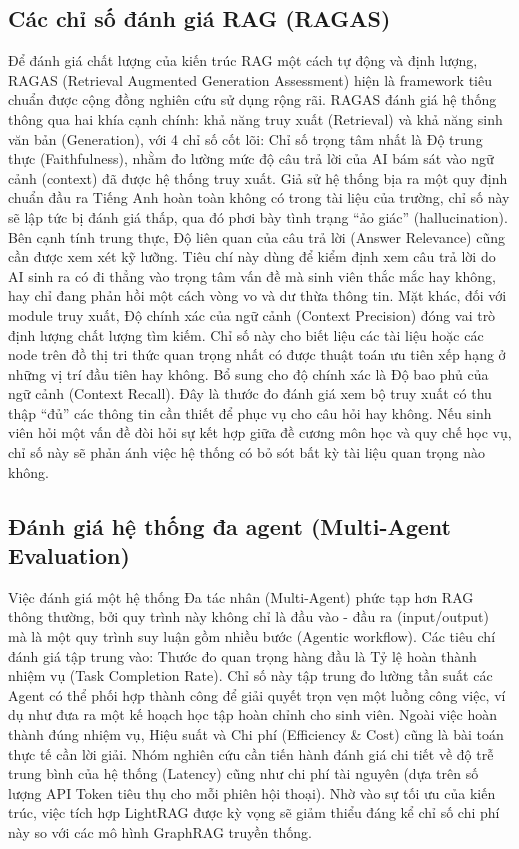 \subsection{Các chỉ số đánh giá RAG (RAGAS)}
Để đánh giá chất lượng của kiến trúc RAG một cách tự động và định lượng, RAGAS (Retrieval Augmented Generation Assessment) \cite{es2023ragas} hiện là framework tiêu chuẩn được cộng đồng nghiên cứu sử dụng rộng rãi. RAGAS đánh giá hệ thống thông qua hai khía cạnh chính: khả năng truy xuất (Retrieval) và khả năng sinh văn bản (Generation), với 4 chỉ số cốt lõi:
Chỉ số trọng tâm nhất là Độ trung thực (Faithfulness), nhằm đo lường mức độ câu trả lời của AI bám sát vào ngữ cảnh (context) đã được hệ thống truy xuất. Giả sử hệ thống bịa ra một quy định chuẩn đầu ra Tiếng Anh hoàn toàn không có trong tài liệu của trường, chỉ số này sẽ lập tức bị đánh giá thấp, qua đó phơi bày tình trạng ``ảo giác'' (hallucination).
Bên cạnh tính trung thực, Độ liên quan của câu trả lời (Answer Relevance) cũng cần được xem xét kỹ lưỡng. Tiêu chí này dùng để kiểm định xem câu trả lời do AI sinh ra có đi thẳng vào trọng tâm vấn đề mà sinh viên thắc mắc hay không, hay chỉ đang phản hồi một cách vòng vo và dư thừa thông tin.
Mặt khác, đối với module truy xuất, Độ chính xác của ngữ cảnh (Context Precision) đóng vai trò định lượng chất lượng tìm kiếm. Chỉ số này cho biết liệu các tài liệu hoặc các node trên đồ thị tri thức quan trọng nhất có được thuật toán ưu tiên xếp hạng ở những vị trí đầu tiên hay không.
Bổ sung cho độ chính xác là Độ bao phủ của ngữ cảnh (Context Recall). Đây là thước đo đánh giá xem bộ truy xuất có thu thập ``đủ'' các thông tin cần thiết để phục vụ cho câu hỏi hay không. Nếu sinh viên hỏi một vấn đề đòi hỏi sự kết hợp giữa đề cương môn học và quy chế học vụ, chỉ số này sẽ phản ánh việc hệ thống có bỏ sót bất kỳ tài liệu quan trọng nào không.

\subsection{Đánh giá hệ thống đa agent (Multi-Agent Evaluation)}
Việc đánh giá một hệ thống Đa tác nhân (Multi-Agent) phức tạp hơn RAG thông thường, bởi quy trình này không chỉ là đầu vào - đầu ra (input/output) mà là một quy trình suy luận gồm nhiều bước (Agentic workflow). Các tiêu chí đánh giá tập trung vào:
Thước đo quan trọng hàng đầu là Tỷ lệ hoàn thành nhiệm vụ (Task Completion Rate). Chỉ số này tập trung đo lường tần suất các Agent có thể phối hợp thành công để giải quyết trọn vẹn một luồng công việc, ví dụ như đưa ra một kế hoạch học tập hoàn chỉnh cho sinh viên.
Ngoài việc hoàn thành đúng nhiệm vụ, Hiệu suất và Chi phí (Efficiency \& Cost) cũng là bài toán thực tế cần lời giải. Nhóm nghiên cứu cần tiến hành đánh giá chi tiết về độ trễ trung bình của hệ thống (Latency) cũng như chi phí tài nguyên (dựa trên số lượng API Token tiêu thụ cho mỗi phiên hội thoại). Nhờ vào sự tối ưu của kiến trúc, việc tích hợp LightRAG được kỳ vọng sẽ giảm thiểu đáng kể chỉ số chi phí này so với các mô hình GraphRAG truyền thống.

